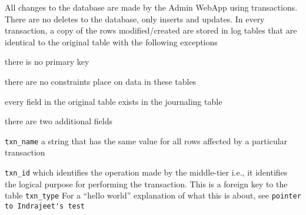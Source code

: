 \documentclass[letterpaper]{article}
\begin{document}
All changes to the database are made by the Admin WebApp using transactions.
There are no deletes to the database, only inserts and updates. 
In every transaction, a copy of the rows modified/created are stored in log
tables that are identical to the original table with the following exceptions
\be
\item there is no primary key
\item there are no constraints place on data in these tables
\item every field in the original table exists in the journaling table
\item there are two additional fields
  \be
\item \verb+txn_name+ a string that has the same value for all rows affected by
  a particular transaction
\item \verb+txn_id+ which identifies the operation made by the middle-tier i.e.,
  it identifies the logical purpose for performing the transaction. This is a
  foreign key to the table \verb+txn_type+
  \ee
  \ee
For a ``hello world'' explanation of what this is about, see 
\verb+pointer to Indrajeet's test+
\end{document}
